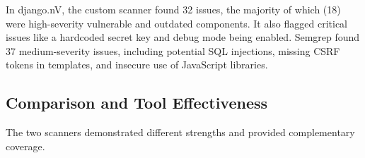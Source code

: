 \begin{table}[h!]
\centering
\caption{Vulnerabilities Identified in django.nV}
\label{tab:djangonv_vulns}
\end{table}

In django.nV, the custom scanner found 32 issues, the majority of which (18) were high-severity vulnerable and outdated components. It also flagged critical issues like a hardcoded secret key and debug mode being enabled. Semgrep found 37 medium-severity issues, including potential SQL injections, missing CSRF tokens in templates, and insecure use of JavaScript libraries.

\subsection{Comparison and Tool Effectiveness}

The two scanners demonstrated different strengths and provided complementary coverage.

